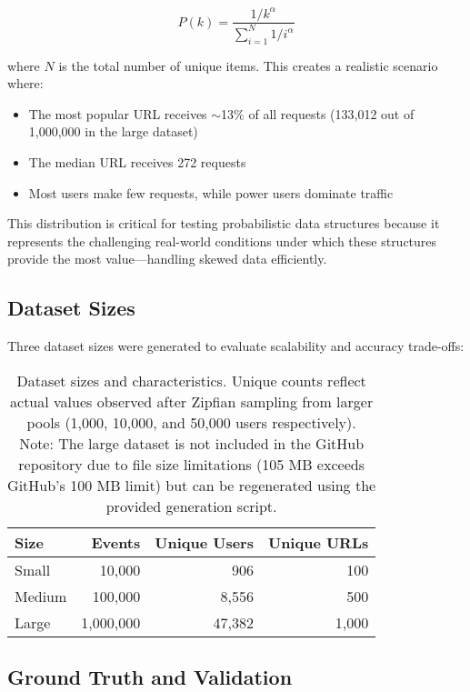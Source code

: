 \begin{equation}
    P(k) = \frac{1/k^{\alpha}}{\sum_{i=1}^{N} 1/i^{\alpha}}
\end{equation}

where $N$ is the total number of unique items. This creates a realistic scenario where:

\begin{itemize}
    \item The most popular URL receives $\sim$13\% of all requests (133,012 out of 1,000,000 in the large dataset)
    \item The median URL receives 272 requests
    \item Most users make few requests, while power users dominate traffic
\end{itemize}

This distribution is critical for testing probabilistic data structures because it represents the challenging real-world conditions under which these structures provide the most value---handling skewed data efficiently.

\subsection{Dataset Sizes}

Three dataset sizes were generated to evaluate scalability and accuracy trade-offs:

\begin{table}[h]
\centering
\begin{tabular}{@{}lrrr@{}}
\toprule
\textbf{Size} & \textbf{Events} & \textbf{Unique Users} & \textbf{Unique URLs} \\
\midrule
Small  & 10,000     & 906       & 100  \\
Medium & 100,000    & 8,556     & 500  \\
Large  & 1,000,000  & 47,382    & 1,000 \\
\bottomrule
\end{tabular}
\caption{Dataset sizes and characteristics. Unique counts reflect actual values observed after Zipfian sampling from larger pools (1,000, 10,000, and 50,000 users respectively). Note: The large dataset is not included in the GitHub repository due to file size limitations (105 MB exceeds GitHub's 100 MB limit) but can be regenerated using the provided generation script.}
\label{tab:dataset_sizes}
\end{table}

\subsection{Ground Truth and Validation}

